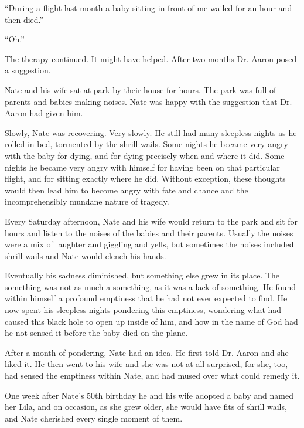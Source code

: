 \documentclass[12pt,oneside,openany]{memoir}
\begin{document}
	“During a flight last month a baby sitting in front of me wailed for an hour and then died.”
	
	“Oh.”
	
	The therapy continued. It might have helped. After two months Dr. Aaron posed a suggestion.
	
	Nate and his wife sat at park by their house for hours. The park was full of parents and babies making noises. Nate was happy with the suggestion that Dr. Aaron had given him.
	
	Slowly, Nate was recovering. Very slowly. He still had many sleepless nights as he rolled in bed, tormented by the shrill wails. Some nights he became very angry with the baby for dying, and for dying precisely when and where it did. Some nights he became very angry with himself for having been on that particular flight, and for sitting exactly where he did. Without exception, these thoughts would then lead him to become angry with fate and chance and the incomprehensibly mundane nature of tragedy.
	
	Every Saturday afternoon, Nate and his wife would return to the park and sit for hours and listen to the noises of the babies and their parents. Usually the noises were a mix of laughter and giggling and yells, but sometimes the noises included shrill wails and Nate would clench his hands.
	
	Eventually his sadness diminished, but something else grew in its place. The something was not as much a something, as it was a lack of something. He found within himself a profound emptiness that he had not ever expected to find. He now spent his sleepless nights pondering this emptiness, wondering what had caused this black hole to open up inside of him, and how in the name of God had he not sensed it before the baby died on the plane.
	
	After a month of pondering, Nate had an idea. He first told Dr. Aaron and she liked it. He then went to his wife and she was not at all surprised, for she, too, had sensed the emptiness within Nate, and had mused over what could remedy it.
	
One week after Nate’s 50th birthday he and his wife adopted a baby and named her Lila, and on occasion, as she grew older, she would have fits of shrill wails, and Nate cherished every single moment of them. 
\end{document}
